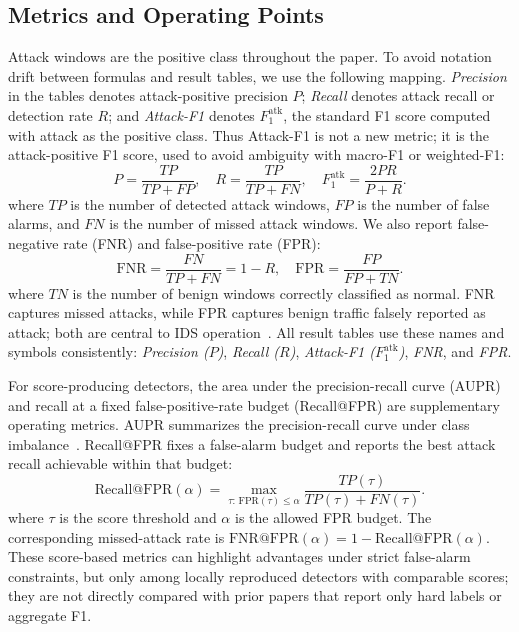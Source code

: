 \documentclass[runningheads]{llncs}
\begin{document}
\subsection{Metrics and Operating Points}
\label{sec:metrics}
Attack windows are the positive class throughout the paper. To avoid notation drift between formulas and result tables, we use the following mapping. \emph{Precision} in the tables denotes attack-positive precision \(P\); \emph{Recall} denotes attack recall or detection rate \(R\); and \emph{Attack-F1} denotes \(F_1^{\mathrm{atk}}\), the standard F1 score computed with attack as the positive class. Thus Attack-F1 is not a new metric; it is the attack-positive F1 score, used to avoid ambiguity with macro-F1 or weighted-F1:
\begin{equation}
  P = \frac{TP}{TP+FP}, \quad
  R = \frac{TP}{TP+FN}, \quad
  F_1^{\mathrm{atk}} = \frac{2PR}{P+R}.
\end{equation}
where \(TP\) is the number of detected attack windows, \(FP\) is the number of false alarms, and \(FN\) is the number of missed attack windows. We also report false-negative rate (FNR) and false-positive rate (FPR):
\begin{equation}
  \mathrm{FNR} = \frac{FN}{TP+FN} = 1-R, \quad
  \mathrm{FPR} = \frac{FP}{FP+TN}.
\end{equation}
where \(TN\) is the number of benign windows correctly classified as normal. FNR captures missed attacks, while FPR captures benign traffic falsely reported as attack; both are central to IDS operation~\cite{ulvila2003ids,gu2006cid,fawcett2006roc}. All result tables use these names and symbols consistently: \emph{Precision (\(P\))}, \emph{Recall (\(R\))}, \emph{Attack-F1 (\(F_1^{\mathrm{atk}}\))}, \emph{FNR}, and \emph{FPR}.

For score-producing detectors, the area under the precision-recall curve (AUPR) and recall at a fixed false-positive-rate budget (Recall@FPR) are supplementary operating metrics. AUPR summarizes the precision-recall curve under class imbalance~\cite{davis2006pr,saito2015pr}. Recall@FPR fixes a false-alarm budget and reports the best attack recall achievable within that budget:
\begin{equation}
  \mathrm{Recall@FPR}(\alpha) = \max_{\tau:\,\mathrm{FPR}(\tau)\leq\alpha}
  \frac{TP(\tau)}{TP(\tau)+FN(\tau)}.
\end{equation}
where \(\tau\) is the score threshold and \(\alpha\) is the allowed FPR budget. The corresponding missed-attack rate is \(\mathrm{FNR@FPR}(\alpha)=1-\mathrm{Recall@FPR}(\alpha)\). These score-based metrics can highlight advantages under strict false-alarm constraints, but only among locally reproduced detectors with comparable scores; they are not directly compared with prior papers that report only hard labels or aggregate F1.
\FloatBarrier
\end{document}
